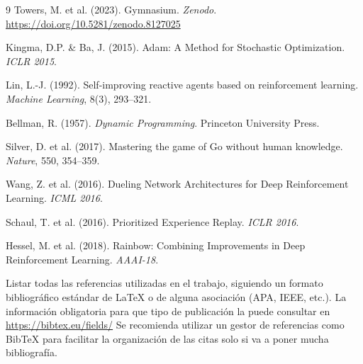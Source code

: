 \documentclass[a4paper, 10pt, twocolumn]{report}
\begin{document}
\begin{thebibliography}{9}
    Towers, M. et al. (2023). Gymnasium. \textit{Zenodo}. \url{https://doi.org/10.5281/zenodo.8127025}

    Kingma, D.P. \& Ba, J. (2015). Adam: A Method for Stochastic Optimization. \textit{ICLR 2015}.

    Lin, L.-J. (1992). Self-improving reactive agents based on reinforcement learning. \textit{Machine Learning}, 8(3), 293--321.

    Bellman, R. (1957). \textit{Dynamic Programming}. Princeton University Press.

    Silver, D. et al. (2017). Mastering the game of Go without human knowledge. \textit{Nature}, 550, 354--359.

    Wang, Z. et al. (2016). Dueling Network Architectures for Deep Reinforcement Learning. \textit{ICML 2016}.

    Schaul, T. et al. (2016). Prioritized Experience Replay. \textit{ICLR 2016}.

    Hessel, M. et al. (2018). Rainbow: Combining Improvements in Deep Reinforcement Learning. \textit{AAAI-18}.
    
\end{thebibliography}


Listar todas las referencias utilizadas en el trabajo, siguiendo un formato bibliográfico estándar de \LaTeX\/ o de alguna asociación (APA, IEEE, etc.). La información obligatoria para que tipo de publicación la puede consultar en \url{https://bibtex.eu/fields/} Se recomienda utilizar un gestor de referencias como Bib\TeX\/ para facilitar la organización de las citas solo si va a poner mucha bibliografía. 
\end{document}
